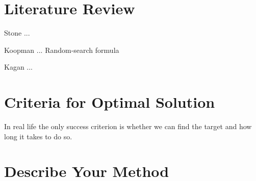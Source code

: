 \documentclass[12pt, letterpaper]{article}  %
\theoremstyle{definition}
\theoremstyle{remark}
\theoremstyle{plain}
\begin{document}

\section{Literature Review}\label{sec:litrev}


Stone ... \cite{83stone}

Koopman ... \cite{46koopman} Random-search formula

Kagan ... \cite{13kagan}






\section{Criteria for Optimal Solution}\label{sec:measure}


In real life the only success criterion is whether we can find the target and how long it takes to do so.


\section{Describe Your Method}\label{sec:mainmethod}

\end{document}

